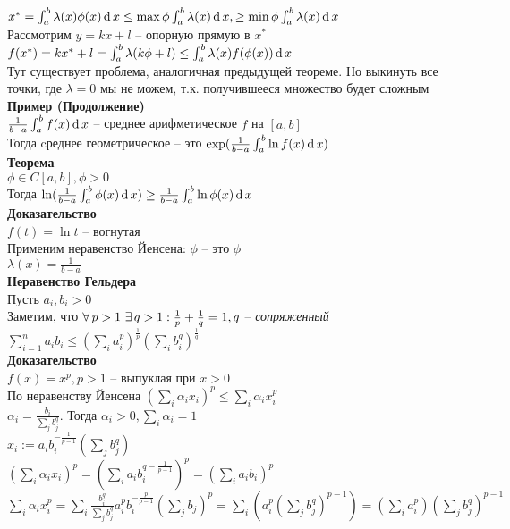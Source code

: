 \documentclass[12pt]{article}
\begin{document}
$x^* = \int_a^b \lambda(x)\phi(x)\operatorname{d} x \leq \max \phi \int_a^b \lambda(x)\operatorname{d} x, \geq \min \phi \int_a^b \lambda(x)\operatorname{d} x$\\
Рассмотрим $y=kx+l$ -- опорную прямую в $x^*$\\
$f(x^*) = kx^*+l = \int_a^b \lambda(k\phi + l) \leq \int_a^b \lambda(x)f(\phi(x)) \operatorname{d} x$\\
Тут существует проблема, аналогичная предыдущей теореме. Но выкинуть все точки, где $\lambda = 0$ мы не можем, т.к. получившееся множество будет сложным\\
\textbf{Пример (Продолжение)}\\
$\frac1{b-a}\int_a^b f(x)\operatorname{d} x$ -- среднее арифметическое $f$ на $[a,b]$\\
Тогда cреднее геометрическое -- это $\exp (\frac1{b-a}\int_a^b \ln f(x) \operatorname{d} x)$\\
\textbf{Теорема}\\
$\phi \in C[a,b], \phi > 0$\\
Тогда $\ln (\frac1{b-a}\int_a^b \phi(x)\operatorname{d} x) \geq \frac1{b-a}\int_a^b \ln \phi(x) \operatorname{d} x$\\
\textbf{Доказательство}\\
$f(t) = \ln t$ -- вогнутая\\
Применим неравенство Йенсена: $\phi$ -- это $\phi$\\
$\lambda(x) = \frac1{b-a}$\\
\textbf{Неравенство Гельдера}\\
Пусть $a_i, b_i > 0$\\
Заметим, что $\forall\, p > 1\ \exists\, q > 1: \frac1p + \frac1q = 1, q$ -- \textit{сопряженный}\\
$\sum_{i=1}^n a_ib_i \leq (\sum_i a_i^p)^{\frac1p}(\sum_i b_i^q)^{\frac1q}$\\
\textbf{Доказательство}\\
$f(x) = x^p, p > 1$ -- выпуклая при $x > 0$\\
По неравенству Йенсена $(\sum_i \alpha_i x_i)^p \leq \sum_i \alpha_i x_i^p$\\
$\alpha_i = \frac{b_i}{\sum_j b_j^q}$. Тогда $\alpha_i > 0, \sum_i \alpha_i = 1$\\
$x_i := a_ib_i^{-\frac1{p-1}} (\sum_j b_j^q)$\\
$(\sum_i \alpha_i x_i)^p = (\sum_i a_i b_i^{q-\frac1{p-1}})^p = (\sum_i a_i b_i)^p$\\
$\sum_i \alpha_ix_i^p = \sum_i \frac{b_i^q}{\sum_j b_j^q} a_i^p b_i^{-\frac{p}{p-1}}(\sum_j b_j)^p = \sum_i (a_i^p (\sum_j b_j^q)^{p-1}) = (\sum_i a_i^p)(\sum_j b_j^q)^{p-1}$\\
\end{document}
